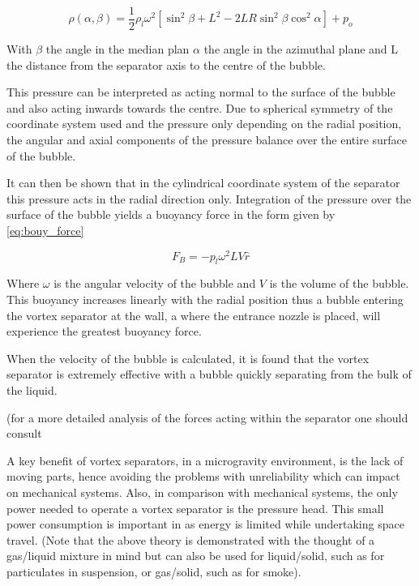 \documentclass[12pt]{article}
\begin{document}
\begin{equation}
\rho(\alpha,\beta)=\frac{1}{2}\rho_l \omega^2\left[\sin^2{\beta}+L^2-2LR\sin^2{\beta}\cos^2{\alpha}\right]+p_o
\label{eq:bubble}
\end{equation}

With $\beta$ the angle in the median plan $\alpha$ the angle in the azimuthal plane and L the distance from the separator axis to the centre of the bubble.

This pressure can be interpreted as acting normal to the surface of the bubble and also acting inwards towards the centre. Due to spherical symmetry of the coordinate system used and the pressure only depending on the radial position, the angular and axial components of the pressure balance over the entire surface of the bubble. 

It can then be shown that in the cylindrical coordinate system of the separator this pressure acts in the radial direction only. Integration of the pressure over the surface of the bubble yields a buoyancy force in the form given by \cref{eq:bouy_force}

\begin{equation}
F_B=-p_l\omega^2 LV\hat{r}
\label{eq:bouy_force}
\end{equation}

Where $\omega$ is the angular velocity of the bubble and $V$ is the volume of the bubble. This buoyancy increases linearly with the radial position thus a bubble entering the vortex separator at the wall, a where the entrance nozzle is placed, will experience the greatest buoyancy force.


When the velocity of the bubble is calculated, it is found that the vortex separator is extremely effective with a bubble quickly separating from the bulk of the liquid.

(for a more detailed analysis of the forces acting within the separator one should consult 

A key benefit of vortex separators, in a microgravity environment, is the lack of moving parts, hence avoiding the problems with unreliability which can impact on mechanical systems. Also, in comparison with mechanical systems, the only power needed to operate a vortex separator is the pressure head. This small power consumption is important in as energy is limited while undertaking space travel. 
(Note that the above theory is demonstrated with the thought of a gas/liquid mixture in mind but can also be used for liquid/solid, such as for particulates in suspension, or gas/solid, such as for smoke).
\end{document}
